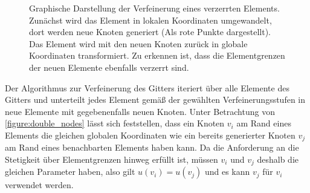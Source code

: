 \documentclass[
	a4paper,			%
	11pt,				%
	headsepline,		%
	bibtotoc,			%
	BCOR18mm,      		%
	DIV14,				%
	headings=normal,
	numbers=noenddot,
]{scrbook}
\theoremstyle{mythmstyle}
\theoremstyle{other}
\begin{document}
\begin{figure}[h]
	 \caption{Graphische Darstellung der Verfeinerung eines verzerrten Elements. Zunächst wird das Element in
	 lokalen Koordinaten umgewandelt, dort werden neue Knoten generiert (Als rote Punkte dargestellt).
	 Das Element wird mit den neuen Knoten zurück in globale Koordinaten transformiert. Zu erkennen ist, dass
	 die Elementgrenzen der neuen Elemente ebenfalls verzerrt sind.}
	 \label{figure:interpolation_2d_local_coords}
	 \end{figure}
	 Der Algorithmus zur Verfeinerung des Gitters iteriert über alle Elemente des Gitters und unterteilt jedes
	 Element gemäß der gewählten Verfeinerungsstufen in neue Elemente mit gegebenenfalls neuen Knoten. Unter 
	 Betrachtung von \autoref{figure:double_nodes} lässt sich feststellen, dass ein Knoten $v_i$ am Rand eines
	  Elements
	 die gleichen globalen Koordinaten wie ein bereits generierter Knoten $v_j$ am Rand
	  eines benachbarten Elements haben
	 kann. Da die Anforderung an die Stetigkeit über Elementgrenzen hinweg erfüllt ist, müssen $v_i$ und $v_j$
	 deshalb die gleichen Parameter haben, also gilt $u(v_i) = u(v_j)$ und es kann $v_j$ für $v_i$ verwendet 
	 werden.
	 
\end{document}
